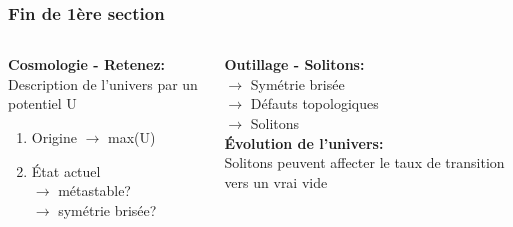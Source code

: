 \documentclass[handout]{beamer}
\begin{document}
  \begin{frame}\frametitle{Fin de 1ère section}
  
  
  
\begin{columns}[T]
    \begin{column}[T]{.5\linewidth}
\textbf{Cosmologie - Retenez:}\\
Description de l'univers par un potentiel U
\begin{enumerate}
 \item Origine $\rightarrow$ max(U)
 \item État actuel \\ $\rightarrow$ métastable? \\ $\rightarrow$ symétrie brisée?
\end{enumerate}
    \end{column}
    \begin{column}[T]{.5\linewidth}
     \textbf{Outillage - Solitons:}\\
     $\rightarrow$ Symétrie brisée \\$\rightarrow$ Défauts topologiques \\$\rightarrow$ Solitons\\[0.5 cm]
     
     
     \textbf{Évolution de l'univers:}\\
     Solitons peuvent affecter le taux de transition vers un vrai vide
    \end{column}
  \end{columns}  
  
  
  
  
  
  
  
  
  
  
  
  
  
  
  

 
%    
  \end{frame}


\end{document}
